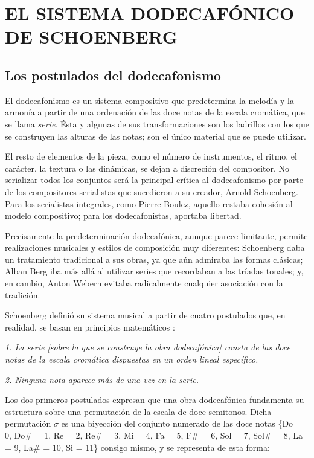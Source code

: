 \section{EL SISTEMA DODECAFÓNICO DE SCHOENBERG}\label{ch:dodecafonismo}
	\subsection{Los postulados del dodecafonismo}
		El dodecafonismo es un sistema compositivo que predetermina la melodía y la armonía a partir de una ordenación de las doce notas de la escala cromática, que se llama \textit{serie}. Ésta y algunas de sus transformaciones son los ladrillos con los que se construyen las alturas de las notas; son el único material que se puede utilizar. 
		
		El resto de elementos de la pieza, como el número de instrumentos, el ritmo, el carácter, la textura o las dinámicas, se dejan a discreción del compositor. No serializar todos los {conjuntos} será la principal crítica al dodecafonismo por parte de los compositores serialistas que sucedieron a su creador, Arnold Schoenberg. Para los serialistas integrales, como Pierre Boulez, aquello restaba cohesión al modelo compositivo; para los dodecafonistas, aportaba libertad. 
		\cite{boulez}
		
		Precisamente la predeterminación dodecafónica, aunque parece limitante, permite realizaciones musicales y estilos de composición muy diferentes: Schoenberg daba un tratamiento tradicional a sus obras, ya que aún admiraba las formas clásicas; Alban Berg iba más allá al utilizar series que recordaban a las tríadas tonales; y, en cambio, Anton Webern evitaba radicalmente cualquier asociación con la tradición. 
		
		Schoenberg definió su sistema musical a partir de cuatro postulados que, en realidad, se basan en principios matemáticos \cite{dominguez}:
		
		\emph{1. La serie \emph{[sobre la que se construye la obra dodecafónica]} consta de las doce notas de la escala cromática dispuestas en un orden lineal específico.}
		
		\emph{2. Ninguna nota aparece más de una vez en la serie.}
		
		Los dos primeros postulados expresan que una obra dodecafónica fundamenta su estructura sobre una {permutación} de la escala de doce semitonos. Dicha permutación $\sigma$ es una biyección del conjunto numerado de las doce notas \{Do = 0, Do\# = 1, Re = 2, Re\# = 3, Mi = 4, Fa = 5, F\# = 6, Sol = 7, Sol\# = 8, La = 9, La\# = 10, Si = 11\} consigo mismo, y se representa de esta forma:
		
